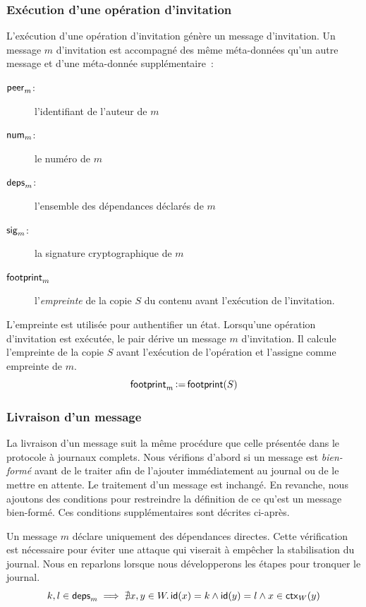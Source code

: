 \subsubsection{Exécution d'une opération d'invitation}

L'exécution d'une opération d'invitation génère un message d'invitation.
Un message $m$ d'invitation est accompagné des même méta-données qu'un autre message et d'une méta-donnée supplémentaire~:
\begin{description}
    \item[$\operatorname{\mathsf{peer}}_m$:] l'identifiant de l'auteur de $m$ 
    \item[$\operatorname{\mathsf{num}}_m$:] le numéro de $m$
    \item[$\operatorname{\mathsf{deps}}_m$:] l'ensemble des dépendances déclarés de $m$
    \item[$\operatorname{\mathsf{sig}}_m$:] la signature cryptographique de $m$
    \item[$\operatorname{\mathsf{footprint}}_m$] l'\emph{empreinte} de la copie $S$ du contenu avant l'exécution de l'invitation.
\end{description}

L'empreinte est utilisée pour authentifier un état.
Lorsqu'une opération d'invitation est exécutée, le pair dérive un message $m$ d'invitation.
Il calcule l'empreinte de la copie $S$ avant l'exécution de l'opération et l'assigne comme empreinte de $m$.
%
\begin{equation*}
    \operatorname{\mathsf{footprint}}_m \operatorname{\vcentcolon=} \operatorname{\mathsf{footprint}}(S)
\end{equation*}


\subsubsection{Livraison d'un message}

La livraison d'un message suit la même procédure que celle présentée dans le protocole à journaux complets.
Nous vérifions d'abord si un message est \emph{bien-formé} avant de le traiter afin de l'ajouter immédiatement au journal ou de le mettre en attente.
Le traitement d'un message est inchangé.
En revanche, nous ajoutons des conditions pour restreindre la définition de ce qu'est un message bien-formé.
Ces conditions supplémentaires sont décrites ci-après.

Un message $m$ déclare uniquement des dépendances directes.
Cette vérification est nécessaire pour éviter une attaque qui viserait à empêcher la stabilisation du journal.
Nous en reparlons lorsque nous développerons les étapes pour tronquer le journal.
%
\begin{equation}\label{eq:direct-dep-verif}
    k, l \in \operatorname{\mathsf{deps}}_m \implies \nexists x, y \in W \ldotp \operatorname{\mathsf{id}}(x) = k \land \operatorname{\mathsf{id}}(y) = l \land x \in \operatorname{\mathsf{ctx}}_W(y)
\end{equation}

